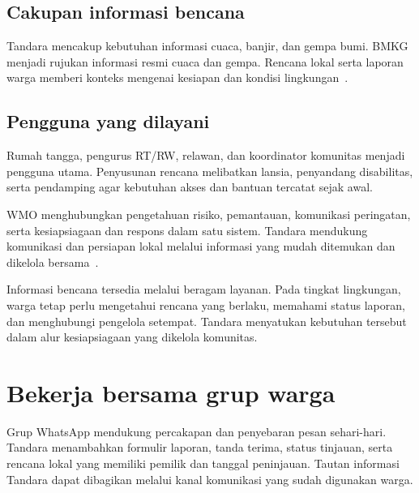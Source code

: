 \documentclass[10pt,a4paper]{article}
\begin{document}
\begin{minipage}[t]{.48\linewidth}\vspace{0pt}\raggedright
\subsection*{Cakupan informasi bencana}
Tandara mencakup kebutuhan informasi cuaca, banjir, dan gempa bumi. BMKG menjadi rujukan informasi resmi cuaca dan gempa. Rencana lokal serta laporan warga memberi konteks mengenai kesiapan dan kondisi lingkungan~\cite{bmkgcap,bmkgforecast,bmkggempa}.
\end{minipage}\hfill
\begin{minipage}[t]{.48\linewidth}\vspace{0pt}\raggedright
\subsection*{Pengguna yang dilayani}
Rumah tangga, pengurus RT/RW, relawan, dan koordinator komunitas menjadi pengguna utama. Penyusunan rencana melibatkan lansia, penyandang disabilitas, serta pendamping agar kebutuhan akses dan bantuan tercatat sejak awal.
\end{minipage}

\begin{WhiteBox}
WMO menghubungkan pengetahuan risiko, pemantauan, komunikasi peringatan, serta kesiapsiagaan dan respons dalam satu sistem. Tandara mendukung komunikasi dan persiapan lokal melalui informasi yang mudah ditemukan dan dikelola bersama~\cite{wmo2024}.
\end{WhiteBox}
\newpage

Informasi bencana tersedia melalui beragam layanan. Pada tingkat lingkungan, warga tetap perlu mengetahui rencana yang berlaku, memahami status laporan, dan menghubungi pengelola setempat. Tandara menyatukan kebutuhan tersebut dalam alur kesiapsiagaan yang dikelola komunitas.



\section*{Bekerja bersama grup warga}
Grup WhatsApp mendukung percakapan dan penyebaran pesan sehari-hari. Tandara menambahkan formulir laporan, tanda terima, status tinjauan, serta rencana lokal yang memiliki pemilik dan tanggal peninjauan. Tautan informasi Tandara dapat dibagikan melalui kanal komunikasi yang sudah digunakan warga.
\end{document}
